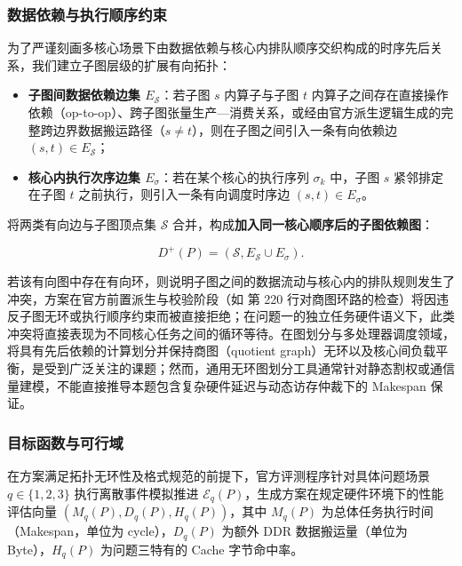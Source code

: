 \documentclass[anonymous,withtoc]{gmcm2026}
\providecommand{\tightlist}{\setlength{\itemsep}{0pt}\setlength{\parskip}{0pt}}
\begin{document}
\subsubsection{数据依赖与执行顺序约束}

为了严谨刻画多核心场景下由数据依赖与核心内排队顺序交织构成的时序先后关系，我们建立子图层级的扩展有向拓扑：

\begin{itemize}
\tightlist
\item
  \textbf{子图间数据依赖边集 \(E_{\mathcal{S}}\)}：若子图 \(s\) 内算子与子图 \(t\) 内算子之间存在直接操作依赖（op-to-op）、跨子图张量生产---消费关系，或经由官方派生逻辑生成的完整跨边界数据搬运路径（\(s \ne t\)），则在子图之间引入一条有向依赖边 \((s, t) \in E_{\mathcal{S}}\)；
\item
  \textbf{核心内执行次序边集 \(E_\sigma\)}：若在某个核心的执行序列 \(\sigma_k\) 中，子图 \(s\) 紧邻排定在子图 \(t\) 之前执行，则引入一条有向调度时序边 \((s, t) \in E_\sigma\)。
\end{itemize}

将两类有向边与子图顶点集 \(\mathcal{S}\) 合并，构成\textbf{加入同一核心顺序后的子图依赖图}：

\begin{equation}
D^+(P) = (\mathcal{S}, E_{\mathcal{S}} \cup E_\sigma).
\end{equation}

若该有向图中存在有向环，则说明子图之间的数据流动与核心内的排队规则发生了冲突，方案在官方前置派生与校验阶段（如 \texttt{} 第 220 行对商图环路的检查）将因违反子图无环或执行顺序约束而被直接拒绝；在问题一的独立任务硬件语义下，此类冲突将直接表现为不同核心任务之间的循环等待。在图划分与多处理器调度领域，将具有先后依赖的计算划分并保持商图（quotient graph）无环以及核心间负载平衡，是受到广泛关注的课题\cite{ref6}；然而，通用无环图划分工具通常针对静态割权或通信量建模，不能直接推导本题包含复杂硬件延迟与动态访存仲裁下的 Makespan 保证。

\subsubsection{目标函数与可行域}

在方案满足拓扑无环性及格式规范的前提下，官方评测程序针对具体问题场景 \(q \in \{1, 2, 3\}\) 执行离散事件模拟推进 \(\mathcal{E}_q(P)\)，生成方案在规定硬件环境下的性能评估向量 \((M_q(P), D_q(P), H_q(P))\)，其中 \(M_q(P)\) 为总体任务执行时间（Makespan，单位为 cycle），\(D_q(P)\) 为额外 DDR 数据搬运量（单位为 Byte），\(H_q(P)\) 为问题三特有的 Cache 字节命中率。
\end{document}

